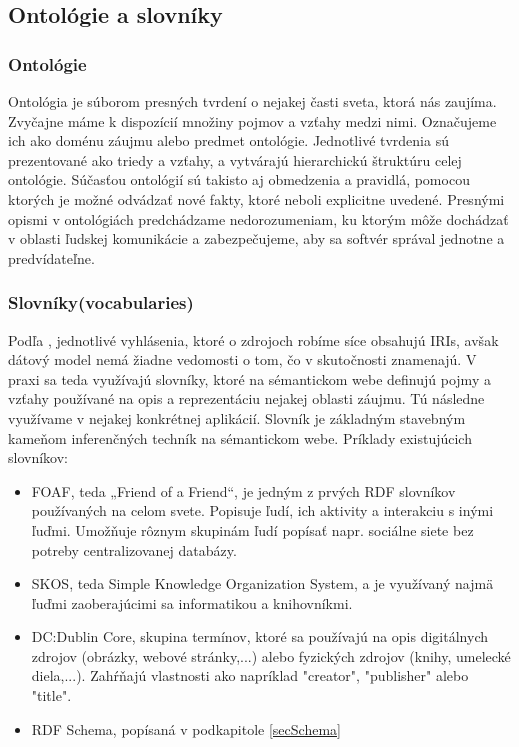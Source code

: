 \subsection{Ontológie a slovníky} \label{secOntology}
\subsubsection{Ontológie}
Ontológia \cite{owl} je súborom presných tvrdení o nejakej časti sveta, ktorá nás zaujíma. Zvyčajne máme k dispozícií množiny pojmov a vzťahy medzi nimi. Označujeme ich ako doménu záujmu alebo predmet ontológie. Jednotlivé tvrdenia sú prezentované ako
triedy a vzťahy, a vytvárajú hierarchickú štruktúru celej ontológie.
Súčasťou ontológií sú takisto aj obmedzenia a pravidlá, pomocou ktorých je
možné odvádzať nové fakty, ktoré neboli explicitne uvedené. Presnými
opismi v ontológiách predchádzame nedorozumeniam, ku ktorým môže dochádzať v
oblasti ľudskej komunikácie a zabezpečujeme, aby sa softvér správal jednotne a predvídateľne.

\subsubsection{Slovníky(vocabularies)}
Podľa \cite{rdf, vocabularies}, jednotlivé vyhlásenia, ktoré o zdrojoch robíme síce obsahujú IRIs, avšak
dátový model nemá žiadne vedomosti o tom, čo v skutočnosti znamenajú. V praxi sa
teda využívajú slovníky, ktoré na sémantickom webe definujú pojmy a vzťahy používané na opis a reprezentáciu nejakej oblasti záujmu. Tú následne využívame v nejakej
konkrétnej aplikácií. Slovník je základným stavebným kameňom inferenčných techník
na sémantickom webe. Príklady existujúcich slovníkov:
\begin{itemize}
\item FOAF, teda „Friend of a Friend“, je jedným z prvých RDF slovníkov používaných na celom svete. Popisuje ľudí, ich aktivity a interakciu s inými ľuďmi. Umožňuje rôznym skupinám ľudí popísať napr. sociálne siete bez potreby centralizovanej databázy. 
\item SKOS, teda Simple Knowledge Organization System, a je využívaný najmä ľuďmi zaoberajúcimi sa informatikou a knihovníkmi.
\item DC:Dublin Core, skupina termínov, ktoré sa používajú na opis digitálnych zdrojov (obrázky, webové stránky,...) alebo fyzických zdrojov (knihy, umelecké diela,...). Zahŕňajú vlastnosti ako napríklad "creator", "publisher" alebo "title". 
\item RDF Schema, popísaná v podkapitole \ref{secSchema}
\end{itemize}


